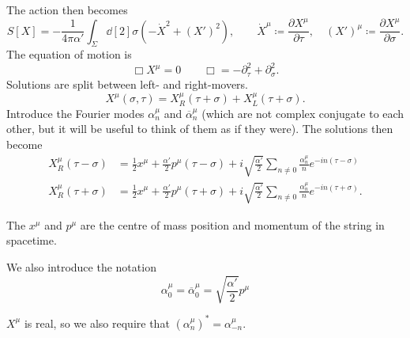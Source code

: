The action then becomes
\begin{equation}
  S[X] = -\frac{1}{4 \pi \alpha'} \int_\Sigma \dd[2]{\sigma} \left( - \dot{X}^2 + (X')^2 \right), \qquad \dot{X}^{\mu} \coloneqq \frac{\partial X^{\mu}}{\partial \tau}, \quad (X')^{\mu} \coloneqq \frac{\partial X^{\mu}}{\partial \sigma}.
\end{equation}
The equation of motion is
\begin{equation}
  \Box X^{\mu} = 0 \qquad \Box = - \partial_\tau^2 + \partial^2_\sigma.
\end{equation}
Solutions are split between left- and right-movers.
\begin{equation}
  X^{\mu}(\sigma, \tau) = X^{\mu}_R(\tau + \sigma) + X_L^{\mu}(\tau + \sigma).
\end{equation}
Introduce the Fourier modes $\alpha^{\mu}_n$  and $\overline{\alpha}^{\mu}_n$  (which are not complex conjugate to each other, but it will be useful to think of them as if they were).
The solutions then become
\begin{align}
  X^{\mu}_R(\tau - \sigma) &= \frac{1}{2} x^{\mu} + \frac{\alpha'}{2} p^{\mu} (\tau - \sigma) + i \sqrt{\frac{\alpha'}{2}} \sum_{n \neq 0} \frac{\alpha_n^{\mu}}{n} e^{-i n (\tau - \sigma)} \\
  X^{\mu}_R(\tau + \sigma) &= \frac{1}{2} x^{\mu} + \frac{\alpha'}{2} p^{\mu} (\tau + \sigma) + i \sqrt{\frac{\alpha'}{2}} \sum_{n \neq 0} \frac{\alpha_n^{\mu}}{n} e^{-i n (\tau + \sigma)}.
\end{align}

The $x^{\mu}$  and $p^{\mu}$  are the centre of mass position and momentum of the string in spacetime.

\begin{notation}[]
  We also introduce the notation 
  \begin{equation}
    \alpha_0^{\mu} = \overline{\alpha}_0^{\mu} = \sqrt{\frac{\alpha'}{2}} p^{\mu}
  \end{equation}
\end{notation}

$X^{\mu}$ is real, so we also require that $(\alpha_n^{\mu})^* = \alpha^{\mu}_{-n}$.

